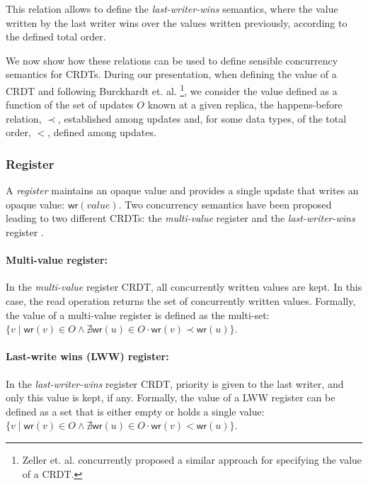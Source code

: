 \documentclass[12pt]{article}
\def\land{\mathrel{\wedge}}
\begin{document}
This relation allows to define the \emph{last-writer-wins} semantics, where the 
value written by the last writer wins over the values written previously, 
according to the defined total order.

We now show how these relations can be used to define sensible concurrency semantics
for CRDTs.
During our presentation, when defining the value of a CRDT and 
following Burckhardt et. al. \cite{Burckhardt14Replicated}\footnote{Zeller et. al. \cite{Zeller14Formal}
concurrently proposed a similar approach for specifying the value of a CRDT.}, we 
consider the value defined as a function of the set of updates $O$ known at 
a given replica, the happens-before relation, $\prec$, established among updates and, for some
data types, of the total order, $<$, defined among updates.

\subsubsection{Register}\label{sec:appdev:conc_sem:register}
A \emph{register} maintains an opaque value and provides a single update
that writes an opaque value: $\mathsf{wr}(\mathit{value})$. 
Two concurrency semantics have been proposed leading to two different CRDTs:
the \emph{multi-value} register and the \emph{last-writer-wins} register \cite{Shapiro11Conflict}.

\paragraph{Multi-value register:}
In the \emph{multi-value} register CRDT, all concurrently written values are kept.
In this case, the read operation returns the set of concurrently written values.
Formally, the value of a multi-value register is 
defined as the multi-set:
$\{v \mid \mathsf{wr}(v) \in O \land \nexists \mathsf{wr}(u) \in O \cdot \mathsf{wr}(v) \prec \mathsf{wr}(u)\}$.

\paragraph{Last-write wins (LWW) register:}
In the \emph{last-writer-wins} register CRDT, priority is given to the last writer,
and only this value is kept, if any. 
Formally, the value of a LWW register can be defined 
as a set that is either empty or holds a single value:
$\{v \mid \mathsf{wr}(v) \in O \land \nexists \mathsf{wr}(u) \in O \cdot \mathsf{wr}(v) < \mathsf{wr}(u)\}$.
\end{document}
